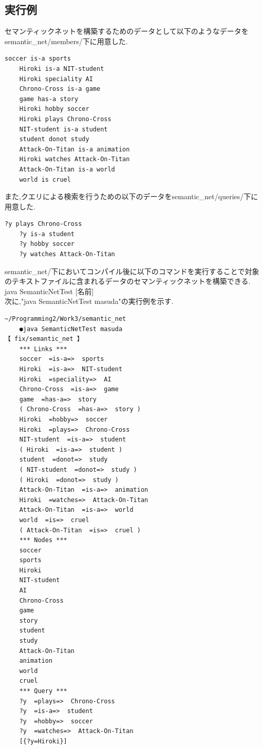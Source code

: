 \documentclass[uplatex,12pt]{jsarticle}
\begin{document}
\subsection{実行例}
セマンティックネットを構築するためのデータとして以下のようなデータをsemantic\_net/members/下に用意した.
\begin{lstlisting}[caption=semantic\_net/members/masuda.txt, label=mid]
    soccer is-a sports
    Hiroki is-a NIT-student
    Hiroki speciality AI
    Chrono-Cross is-a game
    game has-a story
    Hiroki hobby soccer
    Hiroki plays Chrono-Cross
    NIT-student is-a student
    student donot study
    Attack-On-Titan is-a animation
    Hiroki watches Attack-On-Titan
    Attack-On-Titan is-a world
    world is cruel
\end{lstlisting}
また,クエリによる検索を行うための以下のデータをsemantic\_net/queries/下に用意した.
\begin{lstlisting}[caption=semantic\_net/queries/masuda.txt, label=mid]
    ?y plays Chrono-Cross
    ?y is-a student
    ?y hobby soccer
    ?y watches Attack-On-Titan
\end{lstlisting}
semantic\_net/下においてコンパイル後に以下のコマンドを実行することで対象のテキストファイルに含まれるデータのセマンティックネットを構築できる. \\
java SemanticNetTest [名前] \\
次に,"java SemanticNetTest masuda"の実行例を示す.
\begin{lstlisting}[caption=java SemanticNetTest masudaの実行例, label=mid]
    ~/Programming2/Work3/semantic_net
    ●java SemanticNetTest masuda                                                                                                                                                                                           【 fix/semantic_net 】
    *** Links ***
    soccer  =is-a=>  sports
    Hiroki  =is-a=>  NIT-student
    Hiroki  =speciality=>  AI
    Chrono-Cross  =is-a=>  game
    game  =has-a=>  story
    ( Chrono-Cross  =has-a=>  story )
    Hiroki  =hobby=>  soccer
    Hiroki  =plays=>  Chrono-Cross
    NIT-student  =is-a=>  student
    ( Hiroki  =is-a=>  student )
    student  =donot=>  study
    ( NIT-student  =donot=>  study )
    ( Hiroki  =donot=>  study )
    Attack-On-Titan  =is-a=>  animation
    Hiroki  =watches=>  Attack-On-Titan
    Attack-On-Titan  =is-a=>  world
    world  =is=>  cruel
    ( Attack-On-Titan  =is=>  cruel )
    *** Nodes ***
    soccer
    sports
    Hiroki
    NIT-student
    AI
    Chrono-Cross
    game
    story
    student
    study
    Attack-On-Titan
    animation
    world
    cruel
    *** Query ***
    ?y  =plays=>  Chrono-Cross
    ?y  =is-a=>  student
    ?y  =hobby=>  soccer
    ?y  =watches=>  Attack-On-Titan
    [{?y=Hiroki}]
\end{lstlisting}
\end{document}
